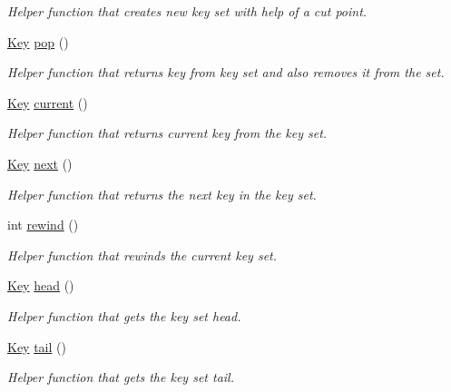 \begin{DoxyCompactItemize}
\begin{DoxyCompactList}\small\item\em Helper function that creates new key set with help of a cut point. \end{DoxyCompactList}\item 
\hyperlink{classorg_1_1libelektra_1_1Key}{Key} \hyperlink{classorg_1_1libelektra_1_1KeySet_a6fcb652d72c64772bae40ec801d93ad9}{pop} ()
\begin{DoxyCompactList}\small\item\em Helper function that returns key from key set and also removes it from the set. \end{DoxyCompactList}\item 
\hyperlink{classorg_1_1libelektra_1_1Key}{Key} \hyperlink{classorg_1_1libelektra_1_1KeySet_a684ac5513b51d841cc04bdcdb203c4cf}{current} ()
\begin{DoxyCompactList}\small\item\em Helper function that returns current key from the key set. \end{DoxyCompactList}\item 
\hyperlink{classorg_1_1libelektra_1_1Key}{Key} \hyperlink{classorg_1_1libelektra_1_1KeySet_a92aa593320132e4272602dda29aee2c7}{next} ()
\begin{DoxyCompactList}\small\item\em Helper function that returns the next key in the key set. \end{DoxyCompactList}\item 
int \hyperlink{classorg_1_1libelektra_1_1KeySet_a20533a5e97b16b76b977b95be179d58c}{rewind} ()
\begin{DoxyCompactList}\small\item\em Helper function that rewinds the current key set. \end{DoxyCompactList}\item 
\hyperlink{classorg_1_1libelektra_1_1Key}{Key} \hyperlink{classorg_1_1libelektra_1_1KeySet_a11ba1ef1213a9f1ac5743491bc7154e5}{head} ()
\begin{DoxyCompactList}\small\item\em Helper function that gets the key set head. \end{DoxyCompactList}\item 
\hyperlink{classorg_1_1libelektra_1_1Key}{Key} \hyperlink{classorg_1_1libelektra_1_1KeySet_ab81aff6c88595b3f4c3307d1f996857f}{tail} ()
\begin{DoxyCompactList}\small\item\em Helper function that gets the key set tail. \end{DoxyCompactList}\item 

\end{DoxyCompactItemize}
